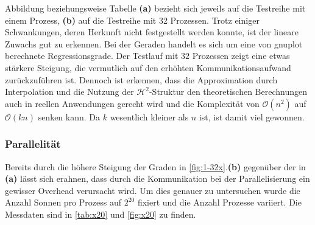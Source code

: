   
  
  
  Abbildung beziehungsweise Tabelle \textbf{(a)} bezieht sich jeweils auf die Testreihe mit einem Prozess, \textbf{(b)} auf die Testreihe mit 32 Prozessen. Trotz einiger Schwankungen, deren Herkunft
  nicht festgestellt werden konnte, ist der lineare Zuwachs gut zu erkennen. Bei der Geraden handelt es sich um eine von gnuplot berechnete Regressionsgrade. Der Testlauf mit $32$ Prozessen zeigt
  eine etwas stärkere Steigung, die vermutlich auf den erhöhten Kommunikationsaufwand zurückzuführen ist. Dennoch ist erkennen, dass die Approximation durch Interpolation und die Nutzung der
  $\mathcal{H}^2$-Struktur den theoretischen Berechnungen auch in reellen Anwendungen gerecht wird und die Komplexität von $\mathcal{O}(n^2)$ auf $\mathcal{O}(k n)$ senken kann. Da $k$ wesentlich 
  kleiner als $n$ ist, ist damit viel gewonnen. 
  
  \subsubsection{Parallelität}
  Bereits durch die höhere Steigung der Graden in \autoref{fig:1-32x}.\textbf{(b)} gegenüber der in \textbf{(a)} lässt sich erahnen, dass durch die Kommunikation bei der Parallelisierung ein gewisser
  Overhead verursacht wird. Um dies genauer zu untersuchen wurde die Anzahl Sonnen pro Prozess auf $2^{20}$ fixiert und die Anzahl Prozesse variiert. Die Messdaten sind in \autoref{tab:x20} und
  \autoref{fig:x20} zu finden.
  
  